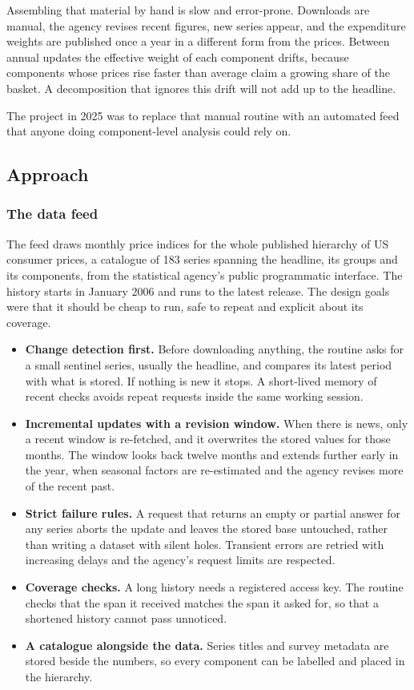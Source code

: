 \documentclass[
  british,
  a4paper,
]{article}
\providecommand{\tightlist}{%
  \setlength{\itemsep}{0pt}\setlength{\parskip}{0pt}}
\begin{document}
Assembling that material by hand is slow and error-prone. Downloads are
manual, the agency revises recent figures, new series appear, and the
expenditure weights are published once a year in a different form from
the prices. Between annual updates the effective weight of each
component drifts, because components whose prices rise faster than
average claim a growing share of the basket. A decomposition that
ignores this drift will not add up to the headline.

The project in 2025 was to replace that manual routine with an automated
feed that anyone doing component-level analysis could rely on.

\subsection{Approach}\label{approach}

\subsubsection{The data feed}\label{the-data-feed}

The feed draws monthly price indices for the whole published hierarchy
of US consumer prices, a catalogue of 183 series spanning the headline,
its groups and its components, from the statistical agency's public
programmatic interface. The history starts in January 2006 and runs to
the latest release. The design goals were that it should be cheap to
run, safe to repeat and explicit about its coverage.

\begin{itemize}
\tightlist
\item
  \textbf{Change detection first.} Before downloading anything, the
  routine asks for a small sentinel series, usually the headline, and
  compares its latest period with what is stored. If nothing is new it
  stops. A short-lived memory of recent checks avoids repeat requests
  inside the same working session.
\item
  \textbf{Incremental updates with a revision window.} When there is
  news, only a recent window is re-fetched, and it overwrites the stored
  values for those months. The window looks back twelve months and
  extends further early in the year, when seasonal factors are
  re-estimated and the agency revises more of the recent past.
\item
  \textbf{Strict failure rules.} A request that returns an empty or
  partial answer for any series aborts the update and leaves the stored
  base untouched, rather than writing a dataset with silent holes.
  Transient errors are retried with increasing delays and the agency's
  request limits are respected.
\item
  \textbf{Coverage checks.} A long history needs a registered access
  key. The routine checks that the span it received matches the span it
  asked for, so that a shortened history cannot pass unnoticed.
\item
  \textbf{A catalogue alongside the data.} Series titles and survey
  metadata are stored beside the numbers, so every component can be
  labelled and placed in the hierarchy.
\end{itemize}
\end{document}
